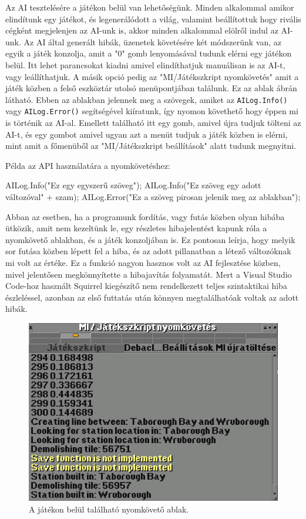 Az AI tesztelésére a játékon belül van lehetőségünk. Minden alkalommal amikor elindítunk egy játékot, és legenerálódott a világ, valamint beállítottuk hogy rivális cégként megjelenjen az AI-unk is, akkor minden alkalommal elölről indul az AI-unk. Az AI által generált hibák, üzenetek követésére két módszerünk van, az egyik a játék konzolja, amit a "0" gomb lenyomásával tudunk elérni egy játékon belül. Itt lehet parancsokat kiadni amivel elindíthatjuk manuálisan is az AI-t, vagy leállíthatjuk. A másik opció pedig az "MI/Játékszkript nyomkövetés" amit a játék közben a felső eszköztár utolsó menüpontjában találunk. Ez az ablak  ábrán látható. Ebben az ablakban jelennek meg a szövegek, amiket az \texttt{AILog.Info()} vagy \texttt{AILog.Error()} segítségével kiíratunk, így nyomon követhető hogy éppen mi is történik az AI-al. Emellett található itt egy gomb, amivel újra tudjuk tölteni az AI-t, és egy gombot amivel ugyan azt a menüt tudjuk a játék közben is elérni, mint amit a főmenüből az "MI/Játékszkript beállítások" alatt tudunk megnyitni.

Példa az API használatára a nyomkövetéshez:
\begin{cpp}
AILog.Info("Ez egy egyszerű szöveg");
AILog.Info("Ez szöveg egy adott változóval" + szam);
AILog.Error("Ez a szöveg pirosan jelenik meg az ablakban");
\end{cpp}

Abban az esetben, ha a programunk fordítás, vagy futás közben olyan hibába ütközik, amit nem kezeltünk le, egy részletes hibajelentést kapunk róla a nyomkövető ablakban, és a játék konzoljában is. Ez pontosan leírja, hogy melyik sor futása közben lépett fel a hiba, és az adott pillanatban a létező változóknak mi volt az értéke. Ez a funkció nagyon hasznos volt az AI fejlesztése közben, mivel jelentősen megkönnyítette a hibajavítás folyamatát. Mert a Visual Studio Code-hoz használt Squirrel kiegészítő nem rendelkezett teljes szintaktikai hiba észleléssel, azonban az első futtatás után könnyen megtalálhatóak voltak az adott hibák.

\begin{figure}
	\centering
	\includegraphics[width=\textwidth]{images/console.png}
	\caption{A játékon belül található nyomkövető ablak.}
	\label{fig:console}
\end{figure}


